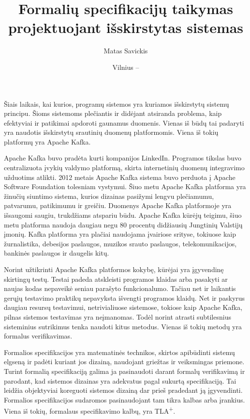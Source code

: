 \documentclass{VUMIFPSmagistrinis}
\title{Formalių specifikacijų taikymas projektuojant išskirstytas sistemas}
\author{Matas Savickis}
\date{Vilnius – \the\year}
\begin{document}
\maketitle

\tableofcontents


		Šiais laikais, kai kurios, programų sistemos yra kuriamos išskirstytų sistemų principu\cite{mcr}.
		Šioms sistemoms plečiantis ir didėjant atsiranda problema, kaip efektyviai ir patikimai apdoroti gaunamus duomenis\cite{bucchiarone2018monolithic}.
		Vienas iš būdų tai padaryti yra naudotis išskirstytų srautinių duomenų platformomis.
		Viena iš tokių platformų yra Apache Kafka\cite{kfk}.


 		Apache Kafka buvo pradėta kurti kompanijos LinkedIn\cite{kfk}. Programos tikslas buvo centralizuota įvykių valdymo platformą, skirta internetinių duomenų integravimo užduotims atlikti.
		2012 metais Apache Kafka sistema buvo perduota į Apache Software Foundation tolesniam vystymui.
		Šiuo metu Apache Kafka platforma yra žinučių siuntimo sistema, kurios dizainas pasižymi lengvu plečiamumu, patvarumu, patikimumu ir greičiu.
		Duomenys Apache Kafka platformoje yra išsaugomi saugiu, trukdžiams atspariu būdu.
		Apache Kafka kūrėjų teigimu, šiuo metu platforma naudoja daugiau negu 80 procentų didžiausių Jungtinių Valstijų įmonių\cite{kfk}.
		Kafka platforma yra plačiai naudojama įvairiose srityse, tokiuose kaip žurnalistika, debesijos paslaugos, muzikos srauto paslaugos, telekomunikacijos, bankinės paslaugos ir daugelis kitų\cite{kfk}.


		Norint užtikrinti Apache Kafka platformos kokybę, kūrėjai yra įgyvendinę skirtingų testų\cite{kfkGH}.
		Testai padeda atskleisti programos klaidas arba pasakyti ar naujas kodas nepaveikė seniau parašyto funkcionalumo\cite{819971}.
		Tačiau net ir laikantis gerųjų testavimo praktikų nepavyksta išvengti programos klaidų.
		Net ir paskyrus daugiau resursų testavimui, netrivialiuose sistemose, tokiose kaip Apache Kafka, pilnas sistemos testavimas yra neįmanomas\cite{sullivan2004software}.
		Todėl norint atrasti subtilesnius sisteminius sutrikimus tenka naudoti kitus metodus.
		Vienas iš tokių metodų yra formalus verifikavimas.


		Formalios specifikacijos yra matematinės technikos, skirtos apibūdinti sistemų elgseną ir padėti kuriant jos dizainą, naudojant griežtas ir veiksmingas priemone\cite{holzmann1995improvement}.
		Turint formalią specifikaciją galima ja pasinaudoti darant formalų verifikavimą ir parodant, kad sistemos dizainas yra adekvatus pagal sukurtą specifikaciją.
		Tai leidžia objektyviai koreguoti sistemos dizainą dar prieš pradedant ją įgyvendinti.
		Formalios specifikacijos sudaromos pasinaudojant tam tikra kalbas arba įrankius.
		Viena iš tokių, formalaus specifikavimo kalbų, yra TLA\textsuperscript{+}.
		
\end{document}
